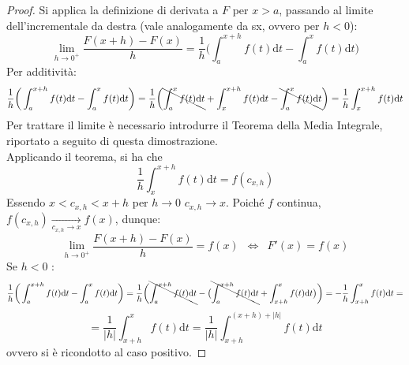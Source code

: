 \documentclass[10pt, oneside]{book}
\theoremstyle{plain}
\begin{document}
\begin{proof}
    Si applica la definizione di derivata a $F$ per $x>a$, passando al limite dell'incrementale da destra (vale analogamente da sx, ovvero per $h < 0$):
    \[\lim\limits_{h \rightarrow 0^+} \frac{F(x+h) - F(x)}{h} = \frac{1}{h}\bigg(\int_a^{x+h}f(t)\textrm{d}t - \int_a^{x}f(t)\textrm{d}t\bigg)\]
    Per additività:
    \[\frac{1}{h}\bigg(\int_a^{x+h}f(t)\textrm{d}t - \int_a^{x}f(t)\textrm{d}t\bigg) = \frac{1}{h}\bigg(\bcancel{\int_a^{x}f(t)\textrm{d}t} + \int_x^{x+h}f(t)\textrm{d}t- \bcancel{\int_a^{x}f(t)\textrm{d}t}\bigg) = \frac{1}{h}\int_x^{x+h}f(t)\textrm{d}t\]
    Per trattare il limite è necessario introdurre il Teorema della Media Integrale, riportato a seguito di questa dimostrazione.
    \\Applicando il teorema, si ha che 
    \[ \frac{1}{h}\int_x^{x+h}f(t)\textrm{d}t = f(c_{x,h})\]
    Essendo $x < c_{x,h} < x+h$ per $h \rightarrow 0$ $c_{x,h} \rightarrow x$. Poiché $f$ continua, $f(c_{x,h}) \xrightarrow[c_{x,h} \rightarrow x]{} f(x)$, dunque:
    \[\lim\limits_{h \rightarrow 0^+} \frac{F(x+h) - F(x)}{h} = f(x) \enspace \Longleftrightarrow \enspace F'(x) = f(x)\]
    Se $h < 0$ :
    \[\frac{1}{h}\bigg(\int_a^{x+h}f(t)\textrm{d}t - \int_a^{x}f(t)\textrm{d}t\bigg) = \frac{1}{h}\bigg(\bcancel{\int_a^{x+h}f(t)\textrm{d}t} - \big(\bcancel{\int_a^{x+h}f(t)\textrm{d}t} + \int_{x+h}^{x}f(t)\textrm{d}t\big)\bigg) = - \frac{1}{h}\int_{x+h}^{x}f(t)\textrm{d}t =\]
    \[= \frac{1}{|h|}\int_{x+h}^{x}f(t)\textrm{d}t = \frac{1}{|h|}\int_{x+h}^{(x+h) + |h|}f(t)\textrm{d}t\]
    ovvero si è ricondotto al caso positivo.
\end{proof}
\end{document}
